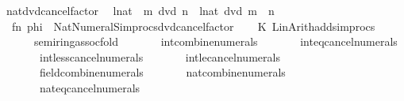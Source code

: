 \begin{isabellebody}
\ nat{\isacharunderscore}{\kern0pt}dvd{\isacharunderscore}{\kern0pt}cancel{\isacharunderscore}{\kern0pt}factor\isanewline
\ \ {\isacharparenleft}{\kern0pt}{\isachardoublequoteopen}{\isacharparenleft}{\kern0pt}{\isacharparenleft}{\kern0pt}l{\isacharcolon}{\kern0pt}{\isacharcolon}{\kern0pt}nat{\isacharparenright}{\kern0pt}\ {\isacharasterisk}{\kern0pt}\ m{\isacharparenright}{\kern0pt}\ dvd\ n{\isachardoublequoteclose}\ {\isacharbar}{\kern0pt}\ {\isachardoublequoteopen}{\isacharparenleft}{\kern0pt}l{\isacharcolon}{\kern0pt}{\isacharcolon}{\kern0pt}nat{\isacharparenright}{\kern0pt}\ dvd\ {\isacharparenleft}{\kern0pt}m\ {\isacharasterisk}{\kern0pt}\ n{\isacharparenright}{\kern0pt}{\isachardoublequoteclose}{\isacharparenright}{\kern0pt}\ {\isacharequal}{\kern0pt}\isanewline
\ \ {\isacartoucheopen}fn\ phi\ {\isacharequal}{\kern0pt}{\isachargreater}{\kern0pt}\ Nat{\isacharunderscore}{\kern0pt}Numeral{\isacharunderscore}{\kern0pt}Simprocs{\isachardot}{\kern0pt}dvd{\isacharunderscore}{\kern0pt}cancel{\isacharunderscore}{\kern0pt}factor{\isacartoucheclose}\isanewline
\isanewline
{}\isamarkupfalse%
\ {\isacartoucheopen}\isanewline
\ \ K\ {\isacharparenleft}{\kern0pt}Lin{\isacharunderscore}{\kern0pt}Arith{\isachardot}{\kern0pt}add{\isacharunderscore}{\kern0pt}simprocs\isanewline
\ \ \ \ \ \ {\isacharbrackleft}{\kern0pt}\isactrlsimproc {\isasymopen}semiring{\isacharunderscore}{\kern0pt}assoc{\isacharunderscore}{\kern0pt}fold{\isasymclose}{\isacharcomma}{\kern0pt}\isanewline
\ \ \ \ \ \ \ \isactrlsimproc {\isasymopen}int{\isacharunderscore}{\kern0pt}combine{\isacharunderscore}{\kern0pt}numerals{\isasymclose}{\isacharcomma}{\kern0pt}\isanewline
\ \ \ \ \ \ \ \isactrlsimproc {\isasymopen}inteq{\isacharunderscore}{\kern0pt}cancel{\isacharunderscore}{\kern0pt}numerals{\isasymclose}{\isacharcomma}{\kern0pt}\isanewline
\ \ \ \ \ \ \ \isactrlsimproc {\isasymopen}intless{\isacharunderscore}{\kern0pt}cancel{\isacharunderscore}{\kern0pt}numerals{\isasymclose}{\isacharcomma}{\kern0pt}\isanewline
\ \ \ \ \ \ \ \isactrlsimproc {\isasymopen}intle{\isacharunderscore}{\kern0pt}cancel{\isacharunderscore}{\kern0pt}numerals{\isasymclose}{\isacharcomma}{\kern0pt}\isanewline
\ \ \ \ \ \ \ \isactrlsimproc {\isasymopen}field{\isacharunderscore}{\kern0pt}combine{\isacharunderscore}{\kern0pt}numerals{\isasymclose}{\isacharcomma}{\kern0pt}\isanewline
\ \ \ \ \ \ \ \isactrlsimproc {\isasymopen}nat{\isacharunderscore}{\kern0pt}combine{\isacharunderscore}{\kern0pt}numerals{\isasymclose}{\isacharcomma}{\kern0pt}\isanewline
\ \ \ \ \ \ \ \isactrlsimproc {\isasymopen}nateq{\isacharunderscore}{\kern0pt}cancel{\isacharunderscore}{\kern0pt}numerals{\isasymclose}{\isacharcomma}{\kern0pt}\isanewline

\end{isabellebody}
